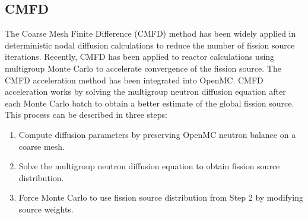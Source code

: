\documentclass{ansconf}
\begin{document}
\subsection{CMFD}

The Coarse Mesh Finite Difference (CMFD) method has been widely applied in
deterministic nodal diffusion calculations to reduce the number of fission
source iterations. Recently, CMFD has been applied to reactor calculations using
multigroup Monte Carlo \cite{physor-lee-2012} to accelerate convergence of the
fission source. The CMFD acceleration method has been integrated into
OpenMC. CMFD acceleration works by solving the multigroup neutron diffusion
equation after each Monte Carlo batch to obtain a better estimate of the global
fission source. This process can be described in three steps:
\begin{enumerate}
 \item Compute diffusion parameters by preserving OpenMC neutron balance on a
   coarse mesh.
 \item Solve the multigroup neutron diffusion equation to obtain fission source
   distribution.
 \item Force Monte Carlo to use fission source distribution from Step 2 by
   modifying source weights.
\end{enumerate}
\end{document}
